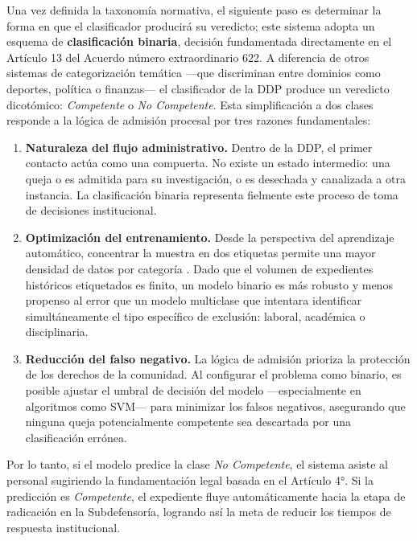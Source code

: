 Una vez definida la taxonomía normativa, el siguiente paso es determinar la
forma en que el clasificador producirá su veredicto; este sistema adopta un
esquema de \textbf{clasificación binaria}, decisión fundamentada directamente en
el Artículo 13 del Acuerdo número extraordinario 622. A diferencia de otros
sistemas de categorización temática —que discriminan entre dominios como
deportes, política o finanzas— el clasificador de la DDP produce un veredicto
dicotómico: \textit{Competente} o \textit{No Competente}. Esta simplificación a
dos clases responde a la lógica de admisión procesal por tres razones
fundamentales:

\begin{enumerate}
  \item \textbf{Naturaleza del flujo administrativo.} Dentro de la DDP, el primer
        contacto actúa como una compuerta. No existe un estado intermedio: una
        queja o es admitida para su investigación, o es desechada y canalizada a
        otra instancia. La clasificación binaria representa fielmente este proceso
        de toma de decisiones institucional.

  \item \textbf{Optimización del entrenamiento.} Desde la perspectiva del
        aprendizaje automático, concentrar la muestra en dos etiquetas permite
        una mayor densidad de datos por categoría \cite{manning2008}. Dado que el volumen de
        expedientes históricos etiquetados es finito, un modelo binario es más
        robusto y menos propenso al error que un modelo multiclase que intentara
        identificar simultáneamente el tipo específico de exclusión: laboral,
        académica o disciplinaria.

  \item \textbf{Reducción del falso negativo.} La lógica de admisión prioriza
        la protección de los derechos de la comunidad. Al configurar el problema
        como binario, es posible ajustar el umbral de decisión del modelo
        —especialmente en algoritmos como SVM— para minimizar los falsos
        negativos, asegurando que ninguna queja potencialmente competente sea
        descartada por una clasificación errónea.
\end{enumerate}

Por lo tanto, si el modelo predice la clase \textit{No Competente}, el sistema
asiste al personal sugiriendo la fundamentación legal basada en el Artículo 4°.
Si la predicción es \textit{Competente}, el expediente fluye automáticamente hacia
la etapa de radicación en la Subdefensoría, logrando así la meta de reducir los
tiempos de respuesta institucional.

